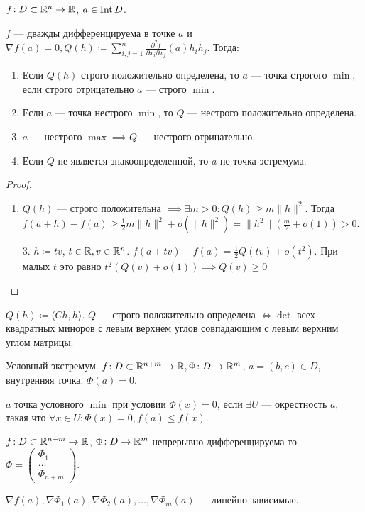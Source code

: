 \begin{theorem}
    $f\!: D \subset \mathbb{R}^n \to \mathbb{R}$,  $a \in \operatorname{Int} D$.

    $f$ --- дважды дифференцируема в точке  $a$ и  $\nabla f(a) = 0, Q(h) \coloneqq \sum\limits_{i, j = 1}^n \frac{\partial^2 f}{\partial x_i \partial x_j}(a) h_ih_j$. Тогда:
    \begin{enumerate}
        \item Если  $Q(h)$ строго положительно определена, то  $a$ --- точка строгого  $\min$, если строго отрицательно $a$ --- строго  $\min$.
        \item Если  $a$ --- точка нестрого  $\min$, то  $Q$ --- нестрого положительно определена.
        \item  $a$ --- нестрого  $\max \implies Q$ --- нестрого отрицательно.
        \item Если  $Q$ не является знакоопределенной, то  $a$ не точка эстремума.
    \end{enumerate}
\end{theorem}
\begin{proof}
    \begin{enumerate}
        \item $Q(h)$ --- строго положительна  $\implies \exists m > 0\!: Q(h) \ge m \|h\|^2$. Тогда $f(a+h) - f(a) \ge \frac{1}{2}m \|h\|^2 + o(\|h\|^2) = \|h^2\|(\frac{m}{2} + o(1)) > 0$.
        \item[3. ] $h \coloneqq tv$,  $t \in \mathbb{R}, v \in \mathbb{R}^n$.  $f(a+tv) - f(a) = \frac{1}{2}Q(tv) + o(t^2)$. При малых $t$ это равно  $t^2(Q(v) + o(1)) \implies Q(v) \ge 0$
    \end{enumerate}
\end{proof}
\begin{theorem}
    $Q(h) \coloneqq \langle Ch, h\rangle$.  $Q$ --- строго положительно определена  $\iff \det$ всех квадратных миноров с левым верхнем углов совпадающим с левым верхним углом матрицы.
\end{theorem}
\begin{definition}
    Условный экстремум. $f\!: D \subset \mathbb{R}^{n+m} \to \mathbb{R}, \Phi\!: D \to \mathbb{R}^m$,  $a = (b, c) \in D$, внутренняя точка.  $\Phi(a) = 0$.

     $a$ точка условного  $\min$ при условии  $\Phi(x) = 0$, если  $\exists U$ --- окрестность  $a$, такая что  $\forall x \in U\!: \Phi(x) = 0, f(a) \le f(x)$.
\end{definition}
\begin{statement}
    $f\!: D\subset \mathbb{R}^{n+m} \to \mathbb{R}$,  $\Phi\!: D \to \mathbb{R}^m$ непрерывно дифференцируема то $\Phi = \begin{pmatrix} \Phi_1 \\ \ldots \\ \Phi_{n+m} \end{pmatrix}$.

    $\nabla f(a), \nabla \Phi_1(a), \nabla \Phi_2(a), \ldots, \nabla \Phi_m(a)$ --- линейно зависимые.
\end{statement}
